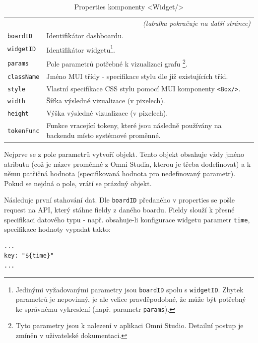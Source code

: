 \documentclass[czech, bc, kiv, he, iso690numb]{fasthesis}
\begin{document}
\begin{center}
	\begin{longtable}{p{}p{}}
	\caption{Properties komponenty <Widget/>}
	\label{tab:widgetProps}\\
	\toprule[1.5pt]
	\endhead
	\midrule
	\multicolumn{2}{r}{\textit{(tabulka pokračuje na další stránce)}}\\
	\endfoot
	\bottomrule[1.5pt]
	\endlastfoot
	\verb"boardID" & Identifikátor dashboardu.  \\
	\midrule
	\verb"widgetID" & Identifikátor widgetu\footnote{Jedinými vyžadovanými parametry jsou \texttt{boardID} spolu s \texttt{widgetID}. Zbytek parametrů je nepovinný, je ale velice pravděpodobné, že může být potřebný ke správnému vykreslení (např. parametr \texttt{params}).}. \\
	\midrule
	\verb"params" & Pole parametrů potřebné k vizualizaci grafu \footnote{Tyto parametry jsou k nalezení v aplikaci Omni Studio. Detailní postup je zmíněn v uživatelské dokumentaci.}. \\
	\midrule
	\verb"className" & Jméno MUI třídy - specifikace stylu dle již existujících tříd. \\
	\midrule
	\verb"style" & Vlastní specifikace CSS stylu pomocí MUI komponenty \texttt{<Box/>}. \\
	\midrule
	\verb"width" & Šířka výsledné vizualizace (v pixelech). \\
	\midrule
	\verb"height" & Výška výsledné vizualizace (v pixelech). \\
	\midrule
	\verb"tokenFunc" & Funkce vracející tokeny, které jsou následně používány na backendu místo systémové proměnné. \\
	\end{longtable}
\end{center}

Nejprve se z pole parametrů vytvoří objekt. Tento objekt obsahuje vždy jméno atributu (což je název proměnné z Omni Studia, kterou je třeba dodefinovat) a k němu patřičná hodnota (specifikovaná
hodnota pro nedefinovaný parametr). Pokud se nejdná o pole, vrátí se prázdný objekt.

Následuje první stahování dat. Dle \texttt{boardID} předaného v properties se pošle request na API, který stáhne fieldy z daného boardu. Fieldy slouží k přesné specifikaci datového typu - např.
obsahuje-li konfigurace widgetu parametr \texttt{time}, specifikace hodnoty vypadat takto:
\lstset{style=plainsrc}
\begin{lstlisting}
...
key: "${time}"
...
\end{lstlisting}
\end{document}
